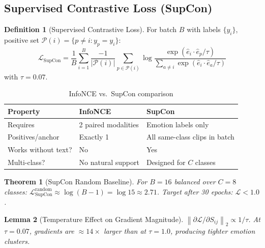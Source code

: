 \documentclass[12pt,a4paper]{article}
\theoremstyle{definition}
\newtheorem{definition}{Definition}[section]
\theoremstyle{plain}
\newtheorem{theorem}{Theorem}[section]
\newtheorem{lemma}[theorem]{Lemma}
\theoremstyle{remark}
\newcommand{\Norm}[1]{\left\|#1\right\|_2}
\begin{document}
\subsection{Supervised Contrastive Loss (SupCon)}

\begin{definition}[Supervised Contrastive Loss]
For batch $B$ with labels $\{y_i\}$, positive set $\mathcal{P}(i) = \{p \ne i : y_p = y_i\}$:
\[
  \boxed{\mathcal{L}_{\text{SupCon}} = \frac{1}{B}\sum_{i=1}^B \frac{-1}{|\mathcal{P}(i)|}
  \sum_{p \in \mathcal{P}(i)} \log\frac{\exp(\hat{e}_i \cdot \hat{e}_p / \tau)}{\sum_{a \ne i} \exp(\hat{e}_i \cdot \hat{e}_a / \tau)}}
\]
with $\tau = 0.07$.
\end{definition}

\begin{table}[H]
\centering
\caption{InfoNCE vs.\ SupCon comparison}
\renewcommand{\arraystretch}{1.2}
\begin{tabular}{lll}
\toprule
\textbf{Property} & \textbf{InfoNCE} & \textbf{SupCon} \\
\midrule
Requires & 2 paired modalities & Emotion labels only \\
Positives/anchor & Exactly 1 & All same-class clips in batch \\
Works without text? & No & Yes \\
Multi-class? & No natural support & Designed for $C$ classes \\
\bottomrule
\end{tabular}
\end{table}

\begin{theorem}[SupCon Random Baseline]
For $B=16$ balanced over $C=8$ classes: $\mathcal{L}_{\text{SupCon}}^{\text{random}} \approx \log(B-1) = \log 15 \approx 2.71$. Target after 30 epochs: $\mathcal{L} < 1.0$.
\end{theorem}

\begin{lemma}[Temperature Effect on Gradient Magnitude]
$\Norm{\partial\mathcal{L}/\partial S_{ij}} \propto 1/\tau$. At $\tau=0.07$, gradients are $\approx 14\times$ larger than at $\tau=1.0$, producing tighter emotion clusters.
\end{lemma}
\end{document}
